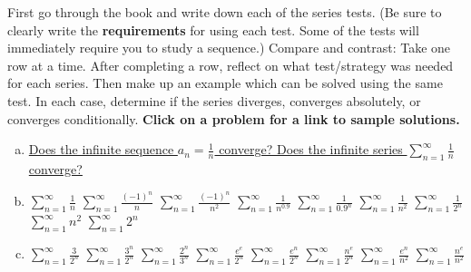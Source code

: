 \documentclass{article}
\begin{document}
\pagestyle{fancy}

\noindent
First go through the book and write down each of the series tests. (Be sure to clearly write the {\bf requirements} for using each test. Some of the tests will immediately require you to study a sequence.) Compare and contrast: Take one row at a time. After completing a row, reflect on what test/strategy was needed for each series. Then make up an example which can be solved using the same test. In each case, determine if the series diverges, converges absolutely, or converges conditionally. {\bf Click on a problem for a link to sample solutions.}

\begin{enumerate}[(a)]

\item\quad
\href{https://edward-kim-math.github.io/key/series/a1.pdf}{Does the infinite sequence $\displaystyle a_n = \frac1n$ converge?
Does the infinite series $\displaystyle \sum_{n=1}^\infty \frac1n$ converge?}

\vfill

\item \quad 
\href{https://edward-kim-math.github.io/key/series/b1.pdf}{$\displaystyle \sum_{n=1}^\infty \frac1n$} %
\quad
\href{https://edward-kim-math.github.io/key/series/b2.pdf}{$\displaystyle \sum_{n=1}^\infty \frac{(-1)^n}n$} %
\quad
\href{https://edward-kim-math.github.io/key/series/b3.pdf}{$\displaystyle \sum_{n=1}^\infty \frac{(-1)^n}{n^2}$} %
\quad
\href{https://edward-kim-math.github.io/key/series/b4.pdf}{$\displaystyle \sum_{n=1}^\infty \frac1{n^{0.9}}$} %
\quad
\href{https://edward-kim-math.github.io/key/series/b5.pdf}{$\displaystyle \sum_{n=1}^\infty \frac1{0.9^n}$}
\quad
\href{https://edward-kim-math.github.io/key/series/b6.pdf}{$\displaystyle \sum_{n=1}^\infty \frac1{n^2}$}
\quad
\href{https://edward-kim-math.github.io/key/series/b7.pdf}{$\displaystyle \sum_{n=1}^\infty \frac1{2^n}$}
\quad
\href{https://edward-kim-math.github.io/key/series/b8.pdf}{$\displaystyle \sum_{n=1}^\infty n^2$}
\quad
\href{https://edward-kim-math.github.io/key/series/b9.pdf}{$\displaystyle \sum_{n=1}^\infty 2^n$}

\vfill

\item\quad
\href{https://edward-kim-math.github.io/key/series/c1.pdf}{$\displaystyle\sum_{n=1}^\infty \frac{3}{2^n}$}
\quad
\href{https://edward-kim-math.github.io/key/series/c2.pdf}{$\displaystyle\sum_{n=1}^\infty \frac{3^n}{2^n}$}
\quad
\href{https://edward-kim-math.github.io/key/series/c3.pdf}{$\displaystyle\sum_{n=1}^\infty \frac{2^n}{3^n}$}
\quad
\href{https://edward-kim-math.github.io/key/series/c4.pdf}{$\displaystyle\sum_{n=1}^\infty \frac{e^e}{2^n}$}
\quad
\href{https://edward-kim-math.github.io/key/series/c5.pdf}{$\displaystyle\sum_{n=1}^\infty \frac{e^n}{2^n}$}
\quad
\href{https://edward-kim-math.github.io/key/series/c6.pdf}{$\displaystyle\sum_{n=1}^\infty \frac{n^e}{2^n}$}
\quad
\href{https://edward-kim-math.github.io/key/series/c7.pdf}{$\displaystyle\sum_{n=1}^\infty \frac{e^n}{n^2}$}
\quad
\href{https://edward-kim-math.github.io/key/series/c8.pdf}{$\displaystyle\sum_{n=1}^\infty \frac{n^e}{n^2}$}
\quad


\end{enumerate}
\end{document}
